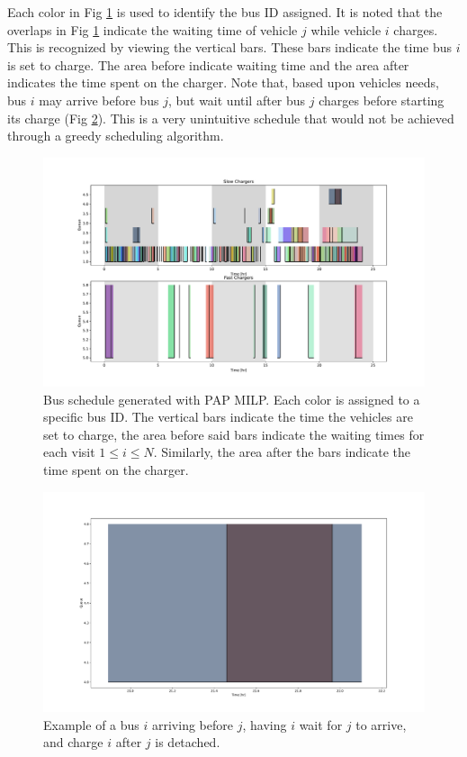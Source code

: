 \documentclass[letterpaper, 10pt, conference]{IEEEtran}
\begin{document}
Each color in Fig \ref{fig:schedule} is used to identify the bus ID assigned. It is noted that the overlaps in Fig \ref{fig:schedule} indicate the waiting time of vehicle \(j\) while vehicle \(i\) charges. This is recognized by viewing the vertical bars. These bars indicate the time bus \(i\) is set to charge. The area before indicate waiting time and the area after indicates the time spent on the charger. Note that, based upon vehicles needs, bus \(i\) may arrive before bus \(j\), but wait until after bus \(j\) charges before starting its charge (Fig \ref{fig:unoptimal}). This is a very unintuitive schedule that would not be achieved through a greedy scheduling algorithm.

\begin{figure}[ht]
	\centering
	\includegraphics[trim=1.5in 0.25in 1.5in 0.5in, width=\linewidth]{schedule.pdf}
	\caption{Bus schedule generated with PAP MILP. Each color is assigned to a specific bus ID. The vertical bars indicate the time the vehicles are set to charge, the area before said bars indicate the waiting times for each visit \(1 \leq i \leq N\). Similarly, the area after the bars indicate the time spent on the charger.}
	\label{fig:schedule}
\end{figure}

\begin{figure}[ht]
	\centering
	\includegraphics[trim=0in 0in 0in 0in, width=\linewidth]{unoptimal.pdf}
	\caption{Example of a bus \(i\) arriving before \(j\), having \(i\) wait for \(j\) to arrive, and charge \(i\) after \(j\) is detached.}
	\label{fig:unoptimal}
\end{figure}
\end{document}
